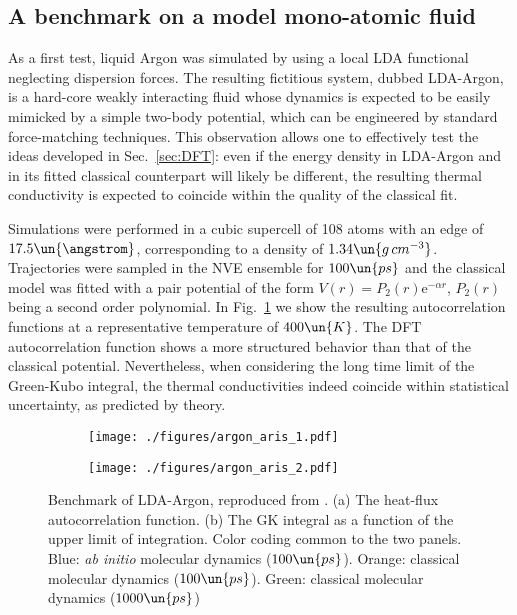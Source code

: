 \subsection{A benchmark on a model mono-atomic fluid}
As a first test, liquid Argon was simulated by \cite{Marcolongo2016} using a local LDA functional neglecting dispersion forces. The resulting fictitious system, dubbed LDA-Argon, is a hard-core weakly interacting fluid whose dynamics is expected to be easily mimicked by a simple two-body potential, which can be engineered by standard force-matching techniques. This observation allows one to effectively test the ideas developed in Sec.~\ref{sec:DFT}: even if the energy density in LDA-Argon and in its fitted classical counterpart will likely be different, the resulting thermal conductivity is expected to coincide within the quality of the classical fit.

Simulations were performed in a cubic supercell of 108 atoms with an edge of $17.5\un{\angstrom}$, corresponding to a density of $1.34\un{g\,cm^{-3}}$. Trajectories were sampled in the NVE ensemble for $100\un{ps}$ and the classical model was fitted with a pair potential of the form $V(r)=P_2(r)\mathrm{e}^{-\alpha r}$, $P_2(r)$ being a second order polynomial. In Fig.~\ref{fig:argon-dft} we show the resulting autocorrelation functions at a representative temperature of $400\un{K}$. The DFT autocorrelation function shows a more structured behavior than that of the classical potential. Nevertheless, when considering the long time limit of the Green-Kubo integral, the thermal conductivities indeed coincide within statistical uncertainty, as predicted by theory.

\begin{figure}
\begin{subfigure}{.5\textwidth}
  \centering
  \texttt{[image: ./figures/argon\_aris\_1.pdf]}
  \caption{}
\end{subfigure}
\begin{subfigure}{.45\textwidth}
  \centering
  \texttt{[image: ./figures/argon\_aris\_2.pdf]}
  \caption{}
\end{subfigure}
\caption{Benchmark of LDA-Argon, reproduced from \cite{Marcolongo2016}.
(a) The heat-flux autocorrelation function.
(b) The GK integral as a function of the upper limit of integration. Color coding common to the two panels. Blue: \emph{ab initio} molecular dynamics ($100\un{ps}$). Orange: classical molecular dynamics ($100\un{ps}$). Green: classical molecular dynamics ($1000\un{ps}$)}
\label{fig:argon-dft}
\end{figure}



